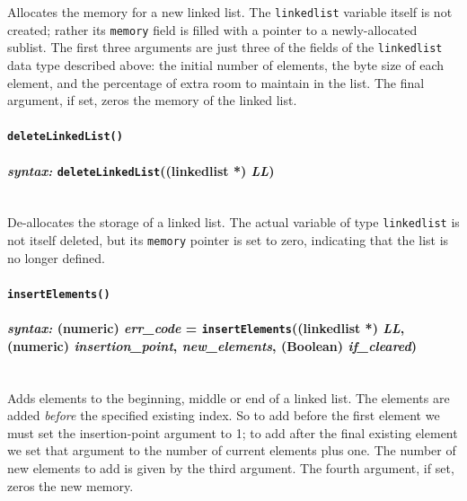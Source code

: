 \documentclass{article}
\begin{document}
Allocates the memory for a new linked list.  The \texttt{linkedlist} variable itself is not created; rather its \texttt{memory} field is filled with a pointer to a newly-allocated sublist.  The first three arguments are just three of the fields of the \texttt{linkedlist} data type described above:  the initial number of elements, the byte size of each element, and the percentage of extra room to maintain in the list.  The final argument, if set, zeros the memory of the linked list.\\




\paragraph{\texttt{deleteLinkedList()}\\\\
\normalfont \emph{syntax: } \texttt{deleteLinkedList}((linkedlist *) \emph{LL})\\\\}

De-allocates the storage of a linked list.  The actual variable of type \texttt{linkedlist} is not itself deleted, but its \texttt{memory} pointer is set to zero, indicating that the list is no longer defined.\\




\paragraph{\texttt{insertElements()}\\\\
\normalfont \emph{syntax: } (numeric) \emph{err\_code} = \texttt{insertElements}((linkedlist *) \emph{LL}, (numeric) \emph{insertion\_point}, \emph{new\_elements}, (Boolean) \emph{if\_cleared})\\\\}

Adds elements to the beginning, middle or end of a linked list.  The elements are added \emph{before} the specified existing index.  So to add before the first element we must set the insertion-point argument to 1; to add after the final existing element we set that argument to the number of current elements plus one.  The number of new elements to add is given by the third argument.  The fourth argument, if set, zeros the new memory.
\end{document}
